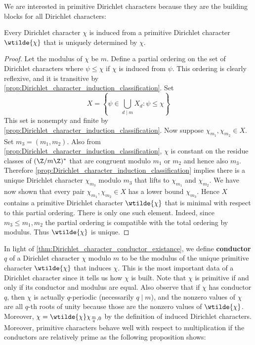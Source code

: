     We are interested in primitive Dirichlet characters because they are the building blocks for all Dirichlet characters:

    \begin{theorem}\label{thm:Dirichlet_character_conductor_existance}
      Every Dirichlet character $\chi$ is induced from a primitive Dirichlet character $\wtilde{\chi}$ that is uniquely determined by $\chi$.
    \end{theorem}
    \begin{proof}
      Let the modulus of $\chi$ be $m$. Define a partial ordering on the set of Dirichlet characters where $\psi \le \chi$ if $\chi$ is induced from $\psi$. This ordering is clearly reflexive, and it is transitive by \cref{prop:Dirichlet_character_induction_classification}. Set
      \[
        X = \left\{\psi \in \bigcup_{d \mid m}X_{d}:\psi \le \chi\right\}
      \]
      This set is nonempty and finite by \cref{prop:Dirichlet_character_induction_classification}. Now suppose $\chi_{m_{1}},\chi_{m_{2}} \in X$. Set $m_{3} = (m_{1},m_{2})$. Also from \cref{prop:Dirichlet_character_induction_classification}, $\chi$ is constant on the residue classes of $(\Z/m\Z)^{\ast}$ that are congruent modulo $m_{1}$ or $m_{2}$ and hence also $m_{3}$. Therefore \cref{prop:Dirichlet_character_induction_classification} implies there is a unique Dirichlet character $\chi_{m_{3}}$ modulo $m_{3}$ that lifts to $\chi_{m_{1}}$ and $\chi_{m_{2}}$. We have now shown that every pair $\chi_{m_{1}},\chi_{m_{2}} \in X$ has a lower bound $\chi_{m_{3}}$. Hence $X$ contains a primitive Dirichlet character $\wtilde{\chi}$ that is minimal with respect to this partial ordering. There is only one such element. Indeed, since $m_{3} \le m_{1},m_{2}$ the partial ordering is compatible with the total ordering by modulus. Thus $\wtilde{\chi}$ is unique.
    \end{proof}

    In light of \cref{thm:Dirichlet_character_conductor_existance}, we define \textbf{conductor} $q$ of a Dirichlet character $\chi$ modulo $m$ to be the modulus of the unique primitive character $\wtilde{\chi}$ that induces $\chi$. This is the most important data of a Dirichlet character since it tells us how $\chi$ is built. Note that $\chi$ is primitive if and only if its conductor and modulus are equal. Also observe that if $\chi$ has conductor $q$, then $\chi$ is actually $q$-periodic (necessarily $q \mid m$), and the nonzero values of $\chi$ are all $q$-th roots of unity because those are the nonzero values of $\wtilde{\chi}$. Moreover, $\chi = \wtilde{\chi}\chi_{\frac{m}{q},0}$ by the definition of induced Dirichlet characters. Moreover, primitive characters behave well with respect to multiplication if the conductors are relatively prime as the following proposition shows:

